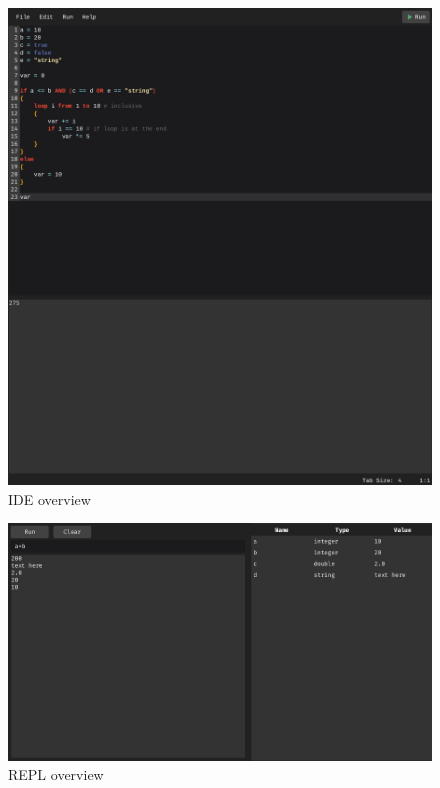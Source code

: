 \documentclass[
]{report}
\begin{document}
\begin{appendices}
	\begin{figure}
		\centering
		\includegraphics[width=\textwidth]{ide-overview}
		\caption{IDE overview}
		\label{fig:ide-overview}
	\end{figure}
	\begin{figure}
		\centering
		\includegraphics[width=\textwidth]{repl-overview}
		\caption{REPL overview}
		\label{fig:repl-overview}
	\end{figure}


\end{appendices}
\end{document}
